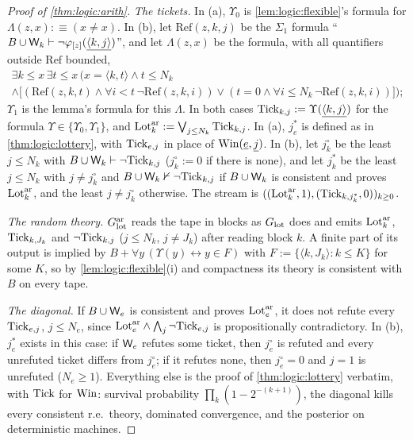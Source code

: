 \begin{proof}[Proof of \cref{thm:logic:arith}]
\emph{The tickets.} In (a), $\Upsilon_0$ is \cref{lem:logic:flexible}'s formula for $\Lambda(z,x):\equiv(x\ne x)$. In (b), let $\mathrm{Ref}(z,k,j)$ be the $\Sigma_1$ formula ``$B\cup\mathsf{W}_{k}\vdash\neg\varphi_{[z]}(\underline{\langle k,j\rangle})$'', and let $\Lambda(z,x)$ be the formula, with all quantifiers outside $\mathrm{Ref}$ bounded,
\begin{multline*}
\exists k\le x\,\exists t\le x\,\Big(x=\langle k,t\rangle\wedge t\le N_k\\
\wedge\big[(\mathrm{Ref}(z,k,t)\wedge\forall i<t\,\neg\mathrm{Ref}(z,k,i))\vee(t=0\wedge\forall i\le N_k\,\neg\mathrm{Ref}(z,k,i))\big]\Big);
\end{multline*}
$\Upsilon_1$ is the lemma's formula for this $\Lambda$. In both cases $\mathrm{Tick}_{k,j}:=\Upsilon(\underline{\langle k,j\rangle})$ for the formula $\Upsilon\in\{\Upsilon_0,\Upsilon_1\}$, and $\mathrm{Lot}^{\rm ar}_k:=\bigvee_{j\le N_k}\mathrm{Tick}_{k,j}$. In (a), $j^*_e$ is defined as in \cref{thm:logic:lottery}, with $\mathrm{Tick}_{e,j}$ in place of $\mathrm{Win}(\underline{e},\underline{j})$. In (b), let $j^\circ_k$ be the least $j\le N_k$ with $B\cup\mathsf{W}_{k}\vdash\neg\mathrm{Tick}_{k,j}$ ($j^\circ_k:=0$ if there is none), and let $j^*_k$ be the least $j\le N_k$ with $j\ne j^\circ_k$ and $B\cup\mathsf{W}_{k}\nvdash\neg\mathrm{Tick}_{k,j}$ if $B\cup\mathsf{W}_{k}$ is consistent and proves $\mathrm{Lot}^{\rm ar}_k$, and the least $j\ne j^\circ_k$ otherwise. The stream is $((\mathrm{Lot}^{\rm ar}_k,1),(\mathrm{Tick}_{k,j^*_k},0))_{k\ge0}$.

\emph{The random theory.} $G^{\rm ar}_{\rm lot}$ reads the tape in blocks as $G_{\mathrm{lot}}$ does and emits $\mathrm{Lot}^{\rm ar}_k$, $\mathrm{Tick}_{k,J_k}$ and $\neg\mathrm{Tick}_{k,j}$ ($j\le N_k$, $j\ne J_k$) after reading block $k$. A finite part of its output is implied by $B+\forall y\,(\Upsilon(y)\leftrightarrow y\in F)$ with $F:=\{\langle k,J_k\rangle:k\le K\}$ for some $K$, so by \cref{lem:logic:flexible}(i) and compactness its theory is consistent with $B$ on every tape.

\emph{The diagonal.} If $B\cup\mathsf{W}_{e}$ is consistent and proves $\mathrm{Lot}^{\rm ar}_e$, it does not refute every $\mathrm{Tick}_{e,j}$, $j\le N_e$, since $\mathrm{Lot}^{\rm ar}_e\wedge\bigwedge_j\neg\mathrm{Tick}_{e,j}$ is propositionally contradictory. In (b), $j^*_e$ exists in this case: if $\mathsf{W}_{e}$ refutes some ticket, then $j^\circ_e$ is refuted and every unrefuted ticket differs from $j^\circ_e$; if it refutes none, then $j^\circ_e=0$ and $j=1$ is unrefuted ($N_e\ge1$). Everything else is the proof of \cref{thm:logic:lottery} verbatim, with $\mathrm{Tick}$ for $\mathrm{Win}$: survival probability $\prod_k(1-2^{-(k+1)})$, the diagonal kills every consistent r.e.\ theory, dominated convergence, and the posterior on deterministic machines.


\end{proof}
